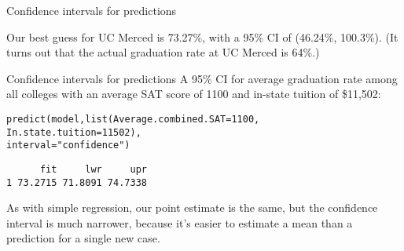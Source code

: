 \documentclass{beamer}\usepackage[]{graphicx}\usepackage[]{color}
\makeatletter
\newcommand{\hlnum}[1]{\textcolor[rgb]{0.824,0.412,0.118}{#1}}%
\newcommand{\hlstr}[1]{\textcolor[rgb]{1,0.894,0.71}{#1}}%
\newcommand{\hlstd}[1]{\textcolor[rgb]{1,0.894,0.769}{#1}}%
\newcommand{\hlkwc}[1]{\textcolor[rgb]{0.78,0.941,0.545}{#1}}%
\newcommand{\hlkwd}[1]{\textcolor[rgb]{1,0.78,0.769}{#1}}%
\newenvironment{kframe}{%
 \def\at@end@of@kframe{}%
 \ifinner\ifhmode%
  \def\at@end@of@kframe{\end{minipage}}%
  \begin{minipage}{\columnwidth}%
 \fi\fi%
 \def\FrameCommand##1{\hskip\@totalleftmargin \hskip-\fboxsep
 \colorbox{shadecolor}{##1}\hskip-\fboxsep
     \hskip-\linewidth \hskip-\@totalleftmargin \hskip\columnwidth}%
 \MakeFramed {\advance\hsize-\width
   \@totalleftmargin\z@ \linewidth\hsize
   \@setminipage}}%
 {\par\unskip\endMakeFramed%
 \at@end@of@kframe}
\newenvironment{knitrout}{}{} %
\makeatother
\begin{document}
\begin{darkframes}
\begin{frame}[fragile]{Confidence intervals for predictions}
      \pause

      Our best guess for UC Merced is 73.27\%, with a 95\% CI of (46.24\%, 100.3\%). \pause (It turns out that the actual graduation rate at UC Merced is 64\%.)
    \end{frame}

    \begin{frame}[fragile]{Confidence intervals for predictions}
      \fontsm
      A 95\% CI for average graduation rate among all colleges with an average SAT score of 1100 and in-state tuition of \$11,502:
      
\begin{knitrout}
\color{fgcolor}\begin{kframe}
\begin{alltt}
\hlkwd{predict}\hlstd{(model,} \hlkwd{list}\hlstd{(}\hlkwc{Average.combined.SAT}\hlstd{=}\hlnum{1100}\hlstd{,}
                    \hlkwc{In.state.tuition}\hlstd{=}\hlnum{11502}\hlstd{),}
               \hlkwc{interval}\hlstd{=}\hlstr{"confidence"}\hlstd{)}
\end{alltt}
\begin{verbatim}
      fit     lwr     upr
1 73.2715 71.8091 74.7338
\end{verbatim}
\end{kframe}
\end{knitrout}

      \bigskip\pause

      As with simple regression, our point estimate is the same, but the confidence interval is much narrower, because it's easier to estimate a mean than a prediction for a single new case.
    \end{frame}


  \end{darkframes}
\end{document}
